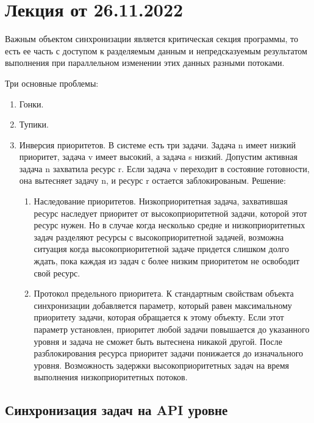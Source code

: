 
\section{Лекция от 26.11.2022}
Важным объектом синхронизации является критическая секция программы, то есть ее
часть с доступом к разделяемым данным и непредсказуемым результатом выполнения
при параллельном изменении этих данных разными потоками.

Три основные проблемы:
\begin{enumerate}
  \item Гонки. 
  \item Тупики.
  \item Инверсия приоритетов. В системе есть три задачи. Задача n имеет низкий
    приоритет, задача v имеет высокий, а задача s низкий. Допустим активная
    задача n захватила ресурс r. Если задача v переходит в состояние готовности,
    она вытесняет задачу n, и ресурс r остается заблокированым. Решение:
    \begin{enumerate}
      \item Наследование приоритетов. Низкоприоритетная задача, захватившая
        ресурс наследует приоритет от высокоприоритетной задачи, которой этот
        ресурс нужен. Но в случае когда несколько средне и низкоприоритетных
        задач разделяют ресурсы с высокоприоритетной задачей, возможна ситуация
        когда высокоприоритетной задаче придется слишком долго ждать, пока
        каждая из задач с более низким приоритетом не освободит свой ресурс.
      \item Протокол предельного приоритета. К стандартным свойствам объекта
        синхронизации добавляется параметр, который равен максимальному
        приоритету задачи, которая обращается к этому объекту. Если этот
        параметр установлен, приоритет любой задачи повышается до указанного
        уровня и задача не сможет быть вытеснена никакой другой. После
        разблокирования ресурса приоритет задачи понижается до изначального
        уровня. Возможность задержки высокоприоритетных задач на время
        выполнения низкоприоритетных потоков.
    \end{enumerate}
\end{enumerate}

\subsection{Синхронизация задач на API уровне}


